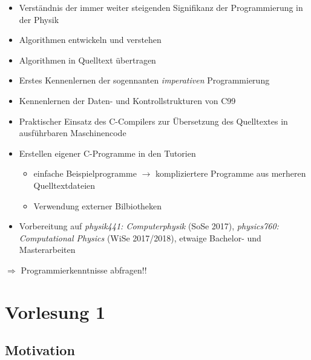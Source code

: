 \begin{itemize}
  \item{Verständnis der immer weiter steigenden Signifikanz der Programmierung in der Physik}
  \item{Algorithmen entwickeln und verstehen}
  \item{Algorithmen in Quelltext übertragen}
  \item{Erstes Kennenlernen der sogennanten \emph{imperativen} Programmierung}
  \item{Kennenlernen der Daten- und Kontrollstrukturen von C99}
  \vspace{0.5cm}
  \item{Praktischer Einsatz des C-Compilers zur Übersetzung des Quelltextes in ausführbaren Maschinencode}
  \item{Erstellen eigener C-Programme in den Tutorien}
  \begin{itemize}
    \item{einfache Beispielprogramme $\rightarrow$ kompliziertere Programme aus merheren Quelltextdateien}
    \item{Verwendung externer Bilbiotheken}
  \end{itemize}
  \vspace{0.5cm}
  \item{Vorbereitung auf \emph{physik441: Computerphysik} (SoSe 2017), \emph{physics760: Computational Physics} (WiSe 2017/2018), etwaige Bachelor- und Masterarbeiten}
\end{itemize}

\iflecturer
\begin{framed}
  $\Rightarrow$ Programmierkenntnisse abfragen!!
\end{framed}
\fi

\section{Vorlesung 1}

\subsection{Motivation}

\iflecturer
\begin{framed}
  
\end{framed}
\fi

